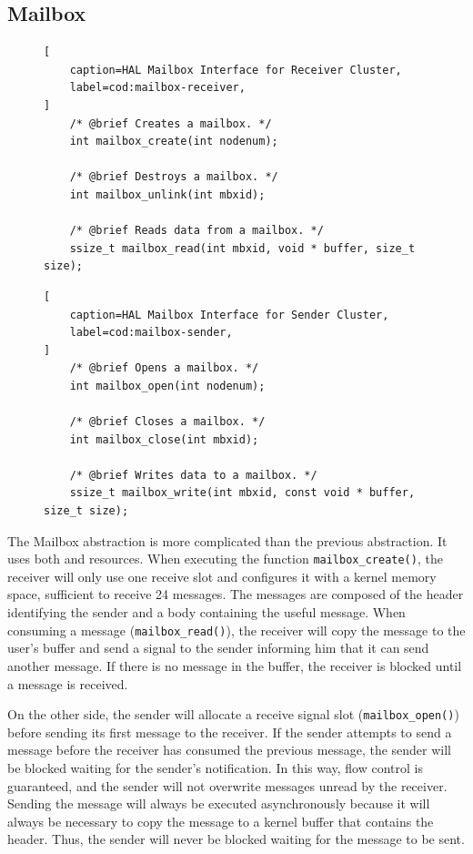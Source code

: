	\subsection{Mailbox}

\begin{figure}[t]
\begin{lstlisting}[
	caption=HAL Mailbox Interface for Receiver Cluster,
	label=cod:mailbox-receiver,
]
	/* @brief Creates a mailbox. */
	int mailbox_create(int nodenum);

	/* @brief Destroys a mailbox. */
	int mailbox_unlink(int mbxid);

	/* @brief Reads data from a mailbox. */
	ssize_t mailbox_read(int mbxid, void * buffer, size_t size);
\end{lstlisting}
\end{figure}

\begin{figure}[t]
\begin{lstlisting}[
	caption=HAL Mailbox Interface for Sender Cluster,
	label=cod:mailbox-sender,
]
	/* @brief Opens a mailbox. */
	int mailbox_open(int nodenum);

	/* @brief Closes a mailbox. */
	int mailbox_close(int mbxid);

	/* @brief Writes data to a mailbox. */
	ssize_t mailbox_write(int mbxid, const void * buffer, size_t size);
\end{lstlisting}
\end{figure}

		The Mailbox abstraction is more complicated than the previous abstraction.
		It uses both \dnoc and \cnoc resources. When executing the function \texttt{mailbox\_create()},
		the receiver will only use one \dnoc receive slot and configures it
		with a kernel memory space, sufficient to receive 24 messages.
		The messages are composed of the header identifying the sender
		and a body containing the useful message.
		When consuming a message (\texttt{mailbox\_read()}), the receiver
		will copy the message to the user's buffer and send a signal
		to the sender informing him that it can send another message.
		If there is no message in the buffer, the receiver is blocked
		until a message is received.

		On the other side, the sender will allocate a receive signal slot (\texttt{mailbox\_open()})
		before sending its first message to the receiver.
		If the sender attempts to send a message before the receiver has consumed
		the previous message, the sender will be blocked waiting for the sender's notification.
		In this way, flow control is guaranteed, and the sender will not overwrite
		messages unread by the receiver.
		Sending the message will always be executed asynchronously
		because it will always be necessary to copy the message to
		a kernel buffer that contains the header.
		Thus, the sender will never be blocked waiting for the message to be sent.

